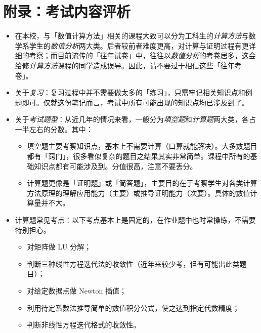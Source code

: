 \chapter{附录：考试内容评析}
\begin{itemize}
\item 在本校，与「数值计算方法」相关的课程大致可以分为工科生的\emph{计算方法}与数学系学生的\emph{数值分析}两大类。后者较前者难度更高，对计算与证明过程有更详细的考察；而目前流传的「往年试卷」中，往往以\emph{数值分析}的考卷居多，这会给修\emph{计算方法}课程的同学造成误导。因此，请不要过于相信这些「往年考卷」。
\item 关于\emph{复习}：复习过程中并不需要做太多的「练习」，只需牢记相关知识点和例题即可。仅就这份笔记而言，考试中所有可能出现的知识点均已涉及到了。
\item 关于\emph{考试题型}：从近几年的情况来看，一般分为\emph{填空题}和\emph{计算题}两大类，各占一半左右的分数。其中：
\begin{itemize}
    \item 填空题主要考察知识点，基本上不需要计算（口算就能解决）。大多数题目都有「窍门」，很多看似复杂的题目之结果其实非常简单。课程中所有的基础知识点都有可能涉及到。分值很高，注意不要丢分。
    \item 计算题更像是「证明题」或「简答题」，主要目的在于考察学生对各类计算方法原理的理解应用能力（主要）或推导证明能力（次要）。具体的数值计算量并不大。
\end{itemize}
\item 计算题常见考点：以下考点基本上是固定的，在作业题中也时常操练，不需要特别担心。
\begin{itemize}\tl
    \item 对矩阵做 LU 分解；
    \item 判断三种线性方程迭代法的收敛性（近年来较少考，但有可能出此类题目）；
    \item 对给定数据点做 Newton 插值；
    \item 利用待定系数法推导简单的数值积分公式，使之达到指定代数精度；
    \item 判断非线性方程迭代格式的收敛性。
\end{itemize}
\end{itemize}
